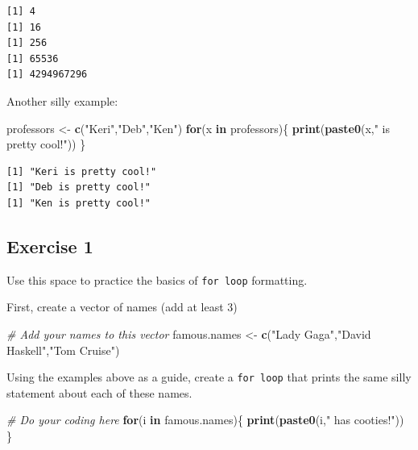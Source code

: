 \documentclass[
]{book}
\newenvironment{Shaded}{\begin{snugshade}}{\end{snugshade}}
\newcommand{\CommentTok}[1]{\textcolor[rgb]{0.56,0.35,0.01}{\textit{#1}}}
\newcommand{\ControlFlowTok}[1]{\textcolor[rgb]{0.13,0.29,0.53}{\textbf{#1}}}
\newcommand{\KeywordTok}[1]{\textcolor[rgb]{0.13,0.29,0.53}{\textbf{#1}}}
\newcommand{\NormalTok}[1]{#1}
\newcommand{\StringTok}[1]{\textcolor[rgb]{0.31,0.60,0.02}{#1}}
\begin{document}
\begin{verbatim}
[1] 4
[1] 16
[1] 256
[1] 65536
[1] 4294967296
\end{verbatim}

Another silly example:

\begin{Shaded}
\begin{Highlighting}[]
\NormalTok{professors <-}\StringTok{ }\KeywordTok{c}\NormalTok{(}\StringTok{"Keri"}\NormalTok{,}\StringTok{"Deb"}\NormalTok{,}\StringTok{"Ken"}\NormalTok{) }
\ControlFlowTok{for}\NormalTok{(x }\ControlFlowTok{in}\NormalTok{ professors)\{}
  \KeywordTok{print}\NormalTok{(}\KeywordTok{paste0}\NormalTok{(x,}\StringTok{" is pretty cool!"}\NormalTok{))}
\NormalTok{\}}
\end{Highlighting}
\end{Shaded}

\begin{verbatim}
[1] "Keri is pretty cool!"
[1] "Deb is pretty cool!"
[1] "Ken is pretty cool!"
\end{verbatim}

\hypertarget{exercise-1-2}{%
\subsection*{Exercise 1}\label{exercise-1-2}}

Use this space to practice the basics of \texttt{for\ loop} formatting.

First, create a vector of names (add at least 3)

\begin{Shaded}
\begin{Highlighting}[]
\CommentTok{# Add your names to this vector}
\NormalTok{famous.names <-}\StringTok{ }\KeywordTok{c}\NormalTok{(}\StringTok{"Lady Gaga"}\NormalTok{,}\StringTok{"David Haskell"}\NormalTok{,}\StringTok{"Tom Cruise"}\NormalTok{)}
\end{Highlighting}
\end{Shaded}

Using the examples above as a guide, create a \texttt{for\ loop} that prints the same silly statement about each of these names.

\begin{Shaded}
\begin{Highlighting}[]
\CommentTok{# Do your coding here}
\ControlFlowTok{for}\NormalTok{(i }\ControlFlowTok{in}\NormalTok{ famous.names)\{}
  \KeywordTok{print}\NormalTok{(}\KeywordTok{paste0}\NormalTok{(i,}\StringTok{" has cooties!"}\NormalTok{))}
\NormalTok{\}}
\end{Highlighting}
\end{Shaded}
\end{document}
